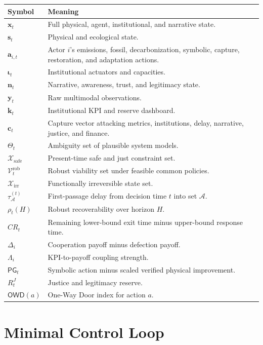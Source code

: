 \documentclass[11pt,a4paper]{article}
\numberwithin{equation}{section}
\theoremstyle{definition}
\theoremstyle{plain}
\theoremstyle{remark}
\newcommand{\safe}{\mathcal{X}_{\mathrm{safe}}}
\newcommand{\irrev}{\mathcal{X}_{\mathrm{irr}}}
\newcommand{\state}{\bm{x}}
\newcommand{\kpi}{\bm{k}}
\newcommand{\action}{\bm{a}}
\newcommand{\capture}{\bm{c}}
\newcommand{\inst}{\bm{\iota}}
\newcommand{\narr}{\bm{n}}
\begin{document}
\begin{longtable}{@{}L{0.20\textwidth}L{0.72\textwidth}@{}}
\toprule
\textbf{Symbol} & \textbf{Meaning} \\
\midrule
$\state_t$ & Full physical, agent, institutional, and narrative state. \\
$\bm{s}_t$ & Physical and ecological state. \\
$\action_{i,t}$ & Actor $i$'s emissions, fossil, decarbonization, symbolic, capture, restoration, and adaptation actions. \\
$\inst_t$ & Institutional actuators and capacities. \\
$\narr_t$ & Narrative, awareness, trust, and legitimacy state. \\
$\bm y_t$ & Raw multimodal observations. \\
$\kpi_t$ & Institutional KPI and reserve dashboard. \\
$\capture_t$ & Capture vector attacking metrics, institutions, delay, narrative, justice, and finance. \\
$\Theta_t$ & Ambiguity set of plausible system models. \\
$\safe$ & Present-time safe and just constraint set. \\
$\mathcal V_t^{\mathrm{rob}}$ & Robust viability set under feasible common policies. \\
$\irrev$ & Functionally irreversible state set. \\
$\tau_{\mathcal A}^{(t)}$ & First-passage delay from decision time $t$ into set $\mathcal A$. \\
$\rho_t(H)$ & Robust recoverability over horizon $H$. \\
$CR_t$ & Remaining lower-bound exit time minus upper-bound response time. \\
$\Delta_i$ & Cooperation payoff minus defection payoff. \\
$\Lambda_i$ & KPI-to-payoff coupling strength. \\
$\mathsf{PG}_t$ & Symbolic action minus scaled verified physical improvement. \\
$R_t^J$ & Justice and legitimacy reserve. \\
$\mathsf{OWD}(a)$ & One-Way Door index for action $a$. \\
\bottomrule
\end{longtable}

\section{Minimal Control Loop}
\end{document}
